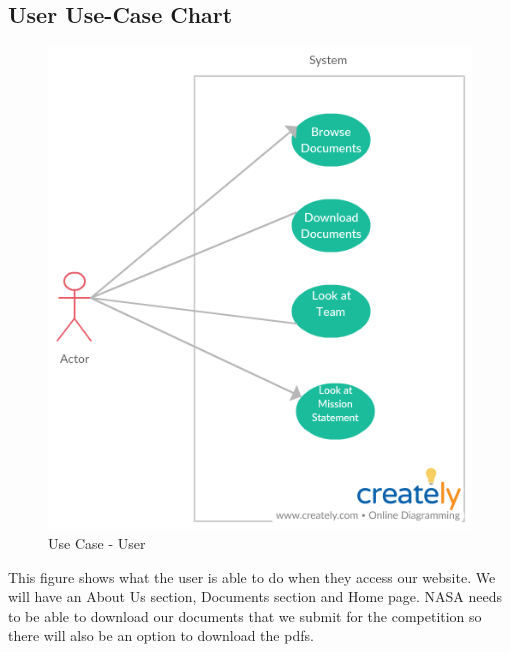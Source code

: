 \documentclass[journal,10pt,draftclsnofoot,onecolumn,compsoc]{IEEEtran} \usepackage[margin=0.75in]{geometry}
\begin{document}
\subsection{User Use-Case Chart}
\begin{figure}[!htp]
    \centering
    \includegraphics[scale = 0.5, width = 1 \textwidth,angle=0]{Website_User_Use_Case.png}
    \caption{Use Case - User}
    \label{fig:my_label}
\end{figure}
This figure shows what the user is able to do when they access our website. We will have an About Us section, Documents section and Home page. NASA needs to be able to download our documents that we submit for the competition so there will also be an option to download the pdfs. 
\end{document}
